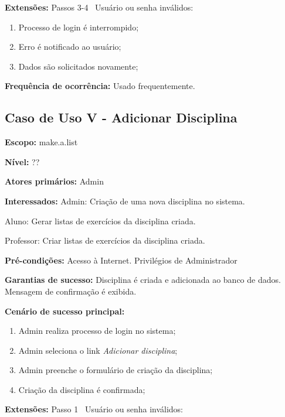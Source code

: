 \documentclass[12pt,oneside,a4paper,article]{abntex2}
\begin{document}
		\textbf{Extensões:} Passos 3-4 \textrightarrow \ Usuário ou senha inválidos:
		
		\begin{enumerate}[label=\alph*.]	
			\item Processo de login é interrompido;
			\item Erro é notificado ao usuário;
			\item Dados são solicitados novamente;
		\end{enumerate}
		
		\textbf{Frequência de ocorrência:} Usado frequentemente.
		
		\subsection{Caso de Uso V - Adicionar Disciplina}
		
		\textbf{Escopo:} make.a.list 
		
		\textbf{Nível:} ??
		
		\textbf{Atores primários:} Admin
		
		\textbf{Interessados:} Admin: Criação de uma nova disciplina no sistema.
		
		Aluno: Gerar listas de exercícios da disciplina criada.
		
		Professor: Criar listas de exercícios da disciplina criada.
		
		\textbf{Pré-condições:} Acesso à Internet. Privilégios de Administrador
		
		\textbf{Garantias de sucesso:} Disciplina é criada e adicionada ao banco de dados. Mensagem de confirmação é exibida.
		
		\textbf{Cenário de sucesso principal:}
		
		\begin{enumerate}
			\item Admin realiza processo de login no sistema;
			
			\item Admin seleciona o link \textit{Adicionar disciplina};
			
			\item Admin preenche o formulário de criação da disciplina;
			
			\item Criação da disciplina é confirmada;
			
			
		\end{enumerate}
		
		\textbf{Extensões:} Passo 1 \textrightarrow \ Usuário ou senha inválidos:
		
\end{document}
